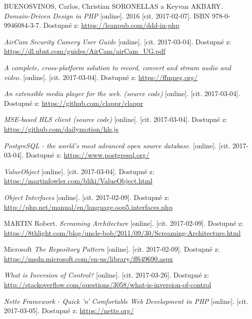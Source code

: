 \begin{thebibliography}{99}

BUENOSVINOS, Carlos, Christian SORONELLAS a Keyvan AKBARY. \textit{Domain-Driven Design in PHP} [online]. 2016 [cit. 2017-02-07]. ISBN 978-0-9946084-3-7. Dostupné z: \url{https://leanpub.com/ddd-in-php}

\textit{AirCam Security Camery User Guide} [online]. [cit. 2017-03-04]. Dostupné z: \url{https://dl.ubnt.com/guides/AirCam/airCam_UG.pdf}

\textit{A complete, cross-platform solution to record, convert and stream audio and video.} [online]. [cit. 2017-03-04]. Dostupné z: \url{https://ffmpeg.org/}

\textit{An extensible media player for the web. (source code)} [online]. [cit. 2017-03-04]. Dostupné z: \url{https://github.com/clappr/clappr}

\textit{MSE-based HLS client (source code)} [online]. [cit. 2017-03-04]. Dostupné z: \url{https://github.com/dailymotion/hls.js}

\textit{PostgreSQL - the world's most advanced open source database.} [online]. [cit. 2017-03-04]. Dostupné z: \url{https://www.postgresql.org/}

\textit{ValueObject} [online]. [cit. 2017-03-04]. Dostupné z: \url{https://martinfowler.com/bliki/ValueObject.html}

\textit{Object Interfaces} [online]. [cit. 2017-02-09]. Dostupné z: \url{http://php.net/manual/en/language.oop5.interfaces.php}

MARTIN Robert. \textit{Screaming Architecture} [online]. [cit. 2017-02-09]. Dostupné z: \url{https://8thlight.com/blog/uncle-bob/2011/09/30/Screaming-Architecture.html}

Microsoft \textit{The Repository Pattern} [online]. [cit. 2017-02-09]. Dostupné z: \url{https://msdn.microsoft.com/en-us/library/ff649690.aspx}

\textit{What is Inversion of Control?} [online]. [cit. 2017-03-26]. Dostupné z: \url{http://stackoverflow.com/questions/3058/what-is-inversion-of-control}

\textit{Nette Framework - Quick 'n' Comfortable Web Development in PHP} [online]. [cit. 2017-03-05]. Dostupné z: \url{https://nette.org/}


\end{thebibliography}
